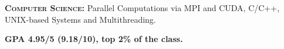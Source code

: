 \begin{cventries}
{\begin{cvitems}
        \item {\textsc{\textbf{Computer Science:}}\hspace{5pt} Parallel Computations via \textsf{MPI and CUDA}, \hspace{5pt}  C/C++, \hspace{5pt} UNIX-based Systems and Multithreading.}
		\item {\textbf{GPA 4.95/5 (9.18/10), top 2\% of the class.}}        
      \end{cvitems}
    }

\end{cventries}
